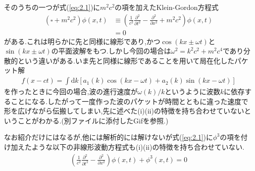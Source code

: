 \documentclass[dvipdfmx,11pt,a4paper,oneside,openany]{jsbook}
\begin{document}
そのうちの一つが式(\ref{eq:2.1})に$m^2c^2$の項を加えたKlein-Gordon方程式
\begin{align}
    \left(\square+m^{2} c^{2}\right) \phi(x, t) & \equiv\left(\frac{1}{c^{2}} \frac{\partial^{2}}{\partial t^{2}}-\frac{\partial^{2}}{\partial x^{2}}+m^{2} c^{2}\right) \phi(x, t)\nonumber \\
                                                & =0
\end{align}
がある.これは明らかに先と同様に線形であり,かつ$\cos(kx\pm \omega t)$と$\sin(kx\pm \omega t)$の平面波解をもつ.しかし今回の場合は$\omega^2=k^2c^2+m^2c^4$であり分散的という違いがある.いま先と同様に線形であることを用いて局在化したパケット解
\begin{align*}
    f(x-ct)=\int \mathrm{d} k\left[a_{1}(k) \cos (k x-\omega t)+a_{2}(k) \sin (k x-\omega t)\right]
\end{align*}
を作ったときに今回の場合,波の進行速度が$\omega(k)/k$というように波数$k$に依存することになる.したがって一度作った波のパケットが時間とともに違った速度で形を広げながら伝搬してしまい,先に述べた(i)(ii)の特徴を持ち合わせていないということがわかる.(別ファイルに添付したGifを参照.)
\begin{figure}[H]
    \centering
    \label{wave(spread)}
\end{figure}
なお紹介だけにはなるが,他には解析的には解けないが式(\ref{eq:2.1})に$\phi^3$の項を付け加えたような以下の非線形波動方程式も(i)(ii)の特徴を持ち合わせていない.
\begin{align}
    \left(\frac{1}{c^{2}} \frac{\partial^{2}}{\partial t^{2}}-\frac{\partial^{2}}{\partial x^{2}}\right) \phi(x, t)+\phi^{3}(x, t)=0\label{eq:2.4}
\end{align}
\end{document}
